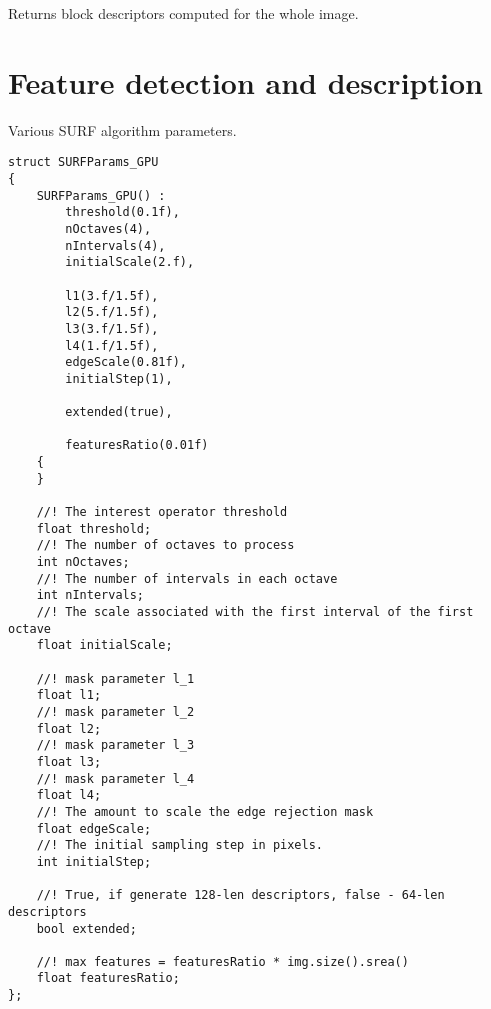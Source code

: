 Returns block descriptors computed for the whole image. 


\begin{description}
\end{description}

\section{Feature detection and description}

Various SURF algorithm parameters. 

\begin{lstlisting}
struct SURFParams_GPU 
{
    SURFParams_GPU() :
        threshold(0.1f), 
        nOctaves(4),
        nIntervals(4),
        initialScale(2.f),

        l1(3.f/1.5f),
        l2(5.f/1.5f),
        l3(3.f/1.5f),
        l4(1.f/1.5f),
        edgeScale(0.81f),
        initialStep(1),

        extended(true),

        featuresRatio(0.01f)
    {
    }

    //! The interest operator threshold
    float threshold;
    //! The number of octaves to process
    int nOctaves;
    //! The number of intervals in each octave
    int nIntervals;
    //! The scale associated with the first interval of the first octave
    float initialScale;

    //! mask parameter l_1
    float l1;
    //! mask parameter l_2 
    float l2;
    //! mask parameter l_3
    float l3;
    //! mask parameter l_4
    float l4;
    //! The amount to scale the edge rejection mask
    float edgeScale;
    //! The initial sampling step in pixels.
    int initialStep;

    //! True, if generate 128-len descriptors, false - 64-len descriptors
    bool extended;

    //! max features = featuresRatio * img.size().srea()
    float featuresRatio;
};
\end{lstlisting}

